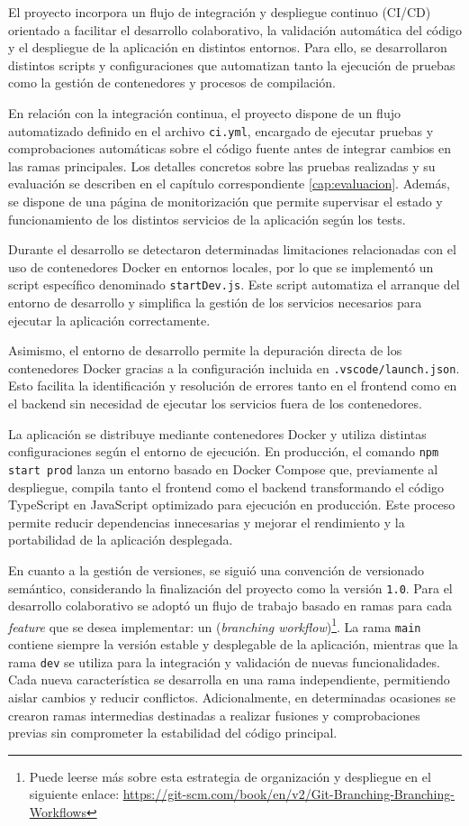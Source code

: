 El proyecto incorpora un flujo de integración y despliegue continuo (CI/CD) orientado a facilitar el desarrollo colaborativo, la validación automática del código y el despliegue de la aplicación en distintos entornos. Para ello, se desarrollaron distintos scripts y configuraciones que automatizan tanto la ejecución de pruebas como la gestión de contenedores y procesos de compilación.

En relación con la integración continua, el proyecto dispone de un flujo automatizado definido en el archivo \texttt{ci.yml}, encargado de ejecutar pruebas y comprobaciones automáticas sobre el código fuente antes de integrar cambios en las ramas principales. Los detalles concretos sobre las pruebas realizadas y su evaluación se describen en el capítulo correspondiente \ref{cap:evaluacion}. Además, se dispone de una página de monitorización que permite supervisar el estado y funcionamiento de los distintos servicios de la aplicación según los tests.

Durante el desarrollo se detectaron determinadas limitaciones relacionadas con el uso de contenedores Docker en entornos locales, por lo que se implementó un script específico denominado \texttt{startDev.js}. Este script automatiza el arranque del entorno de desarrollo y simplifica la gestión de los servicios necesarios para ejecutar la aplicación correctamente.

Asimismo, el entorno de desarrollo permite la depuración directa de los contenedores Docker gracias a la configuración incluida en \texttt{.vscode/launch.json}. Esto facilita la identificación y resolución de errores tanto en el frontend como en el backend sin necesidad de ejecutar los servicios fuera de los contenedores.

La aplicación se distribuye mediante contenedores Docker y utiliza distintas configuraciones según el entorno de ejecución. En producción, el comando \texttt{npm start prod} lanza un entorno basado en Docker Compose que, previamente al despliegue, compila tanto el frontend como el backend transformando el código TypeScript en JavaScript optimizado para ejecución en producción. Este proceso permite reducir dependencias innecesarias y mejorar el rendimiento y la portabilidad de la aplicación desplegada.

En cuanto a la gestión de versiones, se siguió una convención de versionado semántico, considerando la finalización del proyecto como la versión \texttt{1.0}. Para el desarrollo colaborativo se adoptó un flujo de trabajo basado en ramas para cada \textit{feature} que se desea implementar: un (\textit{branching workflow})\footnote{Puede leerse más sobre esta estrategia de organización y despliegue en el siguiente enlace: \url{https://git-scm.com/book/en/v2/Git-Branching-Branching-Workflows}}. La rama \texttt{main} contiene siempre la versión estable y desplegable de la aplicación, mientras que la rama \texttt{dev} se utiliza para la integración y validación de nuevas funcionalidades. Cada nueva característica se desarrolla en una rama independiente, permitiendo aislar cambios y reducir conflictos. Adicionalmente, en determinadas ocasiones se crearon ramas intermedias destinadas a realizar fusiones y comprobaciones previas sin comprometer la estabilidad del código principal.